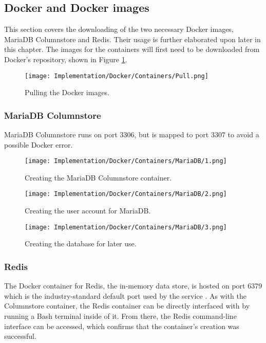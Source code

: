\pagebreak 
\subsection{Docker and Docker images}
This section covers the downloading of the two necessary Docker images, MariaDB Columnstore and Redis. 
Their usage is further elaborated upon later in this chapter. The images for the containers will first need to be
downloaded from Docker's repository, shown in Figure \ref{fig:DockerPull}.

\begin{figure}[H]
    \centering
    \texttt{[image: Implementation/Docker/Containers/Pull.png]}
    \caption{Pulling the Docker images.}
    \label{fig:DockerPull}
\end{figure}

\pagebreak 
\subsubsection{MariaDB Columnstore}
MariaDB Columnstore runs on port 3306, but is mapped to port 3307 to avoid a possible Docker error.

\begin{figure}[H]
    \centering
    \texttt{[image: Implementation/Docker/Containers/MariaDB/1.png]}
    \caption{Creating the MariaDB Columnstore container.}
    \label{fig:CreateMCS}
\end{figure}

\begin{figure}[H]
    \centering
    \texttt{[image: Implementation/Docker/Containers/MariaDB/2.png]}
    \caption{Creating the user account for MariaDB.}
    \label{fig:CreateMCSUser}
\end{figure}

\begin{figure}[H]
    \centering
    \texttt{[image: Implementation/Docker/Containers/MariaDB/3.png]}
    \caption{Creating the database for later use.}
    \label{fig:CreateDB}
\end{figure}

\pagebreak 
\subsubsection{Redis}
The Docker container for Redis, the in-memory data store, is hosted on port 6379 which is the 
industry-standard default port used by the service \autocite{stream_security_security_nodate}. 
As with the Columnstore container, the Redis container can be directly interfaced with by running a 
Bash terminal inside of it. From there, the Redis command-line interface can be accessed, which confirms 
that the container's creation was successful. 

